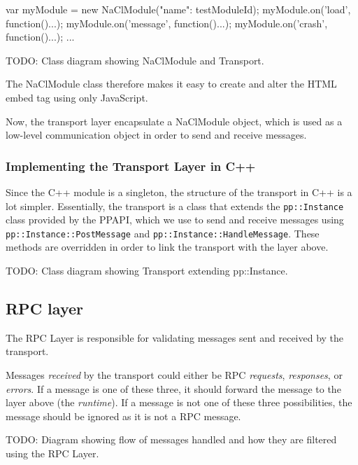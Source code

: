 \begin{code}
var myModule = new NaClModule({"name": testModuleId});
myModule.on('load', function(){...});
myModule.on('message', function(){...});
myModule.on('crash', function(){...});
...
\end{code}

TODO: Class diagram showing NaClModule and Transport.

The NaClModule class therefore makes it easy to create and alter the HTML embed tag using only JavaScript. 

Now, the transport layer encapsulate a NaClModule object, which is used as a low-level communication object in order to send and receive messages. 

\subsubsection{Implementing the Transport Layer in C++} %
\label{ssub:implementing_the_transport_layer_in_cpp_}
Since the C++ module is a singleton, the structure of the transport in C++ is a lot simpler. Essentially, the transport is a class that extends the \lstinline{pp::Instance} class provided by the PPAPI, which we use to send and receive messages using \lstinline{pp::Instance::PostMessage} and \lstinline{pp::Instance::HandleMessage}. These methods are overridden in order to link the transport with the layer above.

TODO: Class diagram showing Transport extending pp::Instance.




\subsection{RPC layer} %
\label{sub:json_rpc_layer_design}
The RPC Layer is responsible for validating messages sent and received by the transport. 

Messages \emph{received} by the transport could either be RPC \emph{requests}, \emph{responses}, or \emph{errors}. If a message is one of these three, it should forward the message to the layer above (the \emph{runtime}). If a message is not one of these three possibilities, the message should be ignored as it is not a RPC message.

TODO: Diagram showing flow of messages handled and how they are filtered using the RPC Layer.

